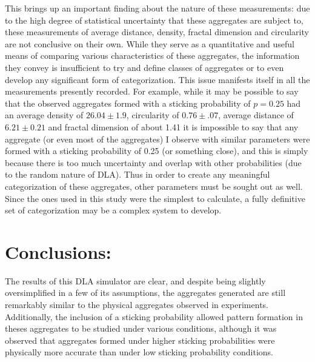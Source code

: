 \documentclass{article}
\begin{document}
This brings up an important finding about the nature of these measurements: due to the high degree of statistical uncertainty that these aggregates are subject to, these measurements of average distance, density, fractal dimension and circularity are not conclusive on their own. While they serve as a quantitative and useful means of comparing various characteristics of these aggregates, the information they convey is insufficient to try and define classes of aggregates or to even develop any significant form of categorization. This issue manifests itself in all the measurements presently recorded. For example, while it may be possible to say that the observed aggregates formed with a sticking probability of $p = 0.25$ had an average density of $26.04 \pm 1.9$, circularity of $0.76 \pm .07$, average distance of $6.21 \pm 0.21$ and fractal dimension of about 1.41 it is impossible to say that any aggregate (or even most of the aggregates) I observe with similar parameters were formed with a sticking probability of 0.25 (or something close), and this is simply because there is too much uncertainty and overlap with other probabilities (due to the random nature of DLA). Thus in order to create any meaningful categorization of these aggregates, other parameters must be sought out as well. Since the ones used in this study were the simplest to calculate, a fully definitive set of categorization may be a complex system to develop.





\section{Conclusions: \label{conclusions}}

The results of this DLA simulator are clear, and despite being slightly oversimplified in a few of its assumptions, the aggregates generated are still remarkably similar to the physical aggregates observed in experiments. Additionally, the inclusion of a sticking probability allowed pattern formation in theses aggregates to be studied under various conditions, although it was observed that aggregates formed under higher sticking probabilities were physically more accurate than under low sticking probability conditions.
\end{document}
